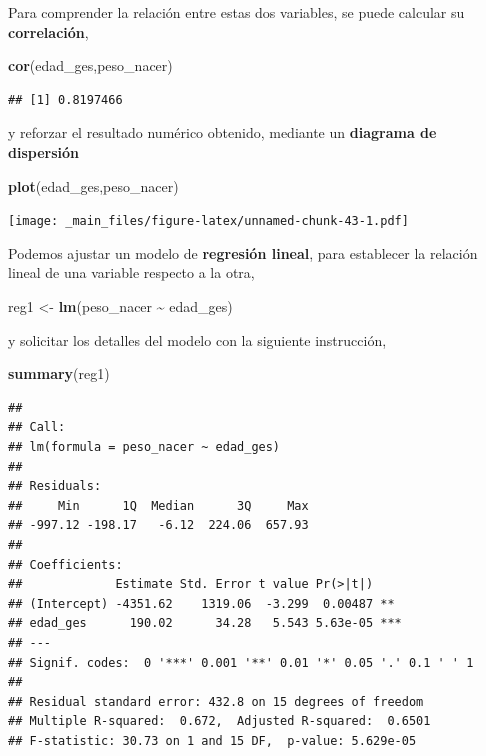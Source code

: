 \documentclass[
]{book}
\newenvironment{Shaded}{\begin{snugshade}}{\end{snugshade}}
\newcommand{\FunctionTok}[1]{\textcolor[rgb]{0.13,0.29,0.53}{\textbf{#1}}}
\newcommand{\NormalTok}[1]{#1}
\newcommand{\OtherTok}[1]{\textcolor[rgb]{0.56,0.35,0.01}{#1}}
\newcommand{\SpecialCharTok}[1]{\textcolor[rgb]{0.81,0.36,0.00}{\textbf{#1}}}
\begin{document}
Para comprender la relación entre estas dos variables, se puede calcular su \textbf{correlación},

\begin{Shaded}
\begin{Highlighting}[]
\FunctionTok{cor}\NormalTok{(edad\_ges,peso\_nacer)}
\end{Highlighting}
\end{Shaded}

\begin{verbatim}
## [1] 0.8197466
\end{verbatim}

y reforzar el resultado numérico obtenido, mediante un \textbf{diagrama de dispersión}

\begin{Shaded}
\begin{Highlighting}[]
\FunctionTok{plot}\NormalTok{(edad\_ges,peso\_nacer)}
\end{Highlighting}
\end{Shaded}

\texttt{[image: \_main\_files/figure-latex/unnamed-chunk-43-1.pdf]}

Podemos ajustar un modelo de \textbf{regresión lineal}, para establecer la relación lineal de una variable respecto a la otra,

\begin{Shaded}
\begin{Highlighting}[]
\NormalTok{reg1 }\OtherTok{\textless{}{-}} \FunctionTok{lm}\NormalTok{(peso\_nacer }\SpecialCharTok{\textasciitilde{}}\NormalTok{ edad\_ges)}
\end{Highlighting}
\end{Shaded}

y solicitar los detalles del modelo con la siguiente instrucción,

\begin{Shaded}
\begin{Highlighting}[]
\FunctionTok{summary}\NormalTok{(reg1) }
\end{Highlighting}
\end{Shaded}

\begin{verbatim}
## 
## Call:
## lm(formula = peso_nacer ~ edad_ges)
## 
## Residuals:
##     Min      1Q  Median      3Q     Max 
## -997.12 -198.17   -6.12  224.06  657.93 
## 
## Coefficients:
##             Estimate Std. Error t value Pr(>|t|)    
## (Intercept) -4351.62    1319.06  -3.299  0.00487 ** 
## edad_ges      190.02      34.28   5.543 5.63e-05 ***
## ---
## Signif. codes:  0 '***' 0.001 '**' 0.01 '*' 0.05 '.' 0.1 ' ' 1
## 
## Residual standard error: 432.8 on 15 degrees of freedom
## Multiple R-squared:  0.672,  Adjusted R-squared:  0.6501 
## F-statistic: 30.73 on 1 and 15 DF,  p-value: 5.629e-05
\end{verbatim}
\end{document}
